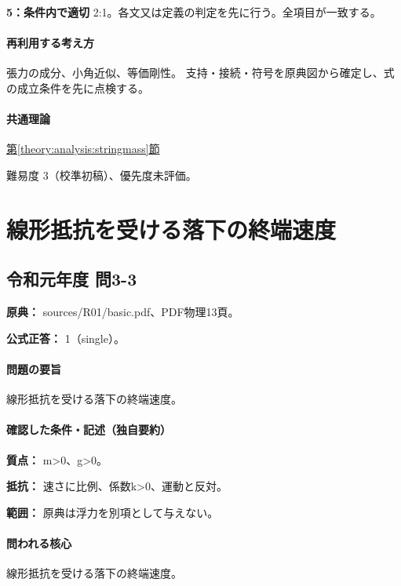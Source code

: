 \noindent\textbf{5：条件内で適切} 2:1。各文又は定義の判定を先に行う。全項目が一致する。\par

\paragraph{再利用する考え方} 張力の成分、小角近似、等価剛性。 支持・接続・符号を原典図から確定し、式の成立条件を先に点検する。

\paragraph{共通理論} \hyperref[theory:analysis:stringmass]{第\ref*{theory:analysis:stringmass}節}

\par 難易度 3（校準初稿）、優先度未評価。

\section{線形抵抗を受ける落下の終端速度}

\subsection{令和元年度 問3-3}
\label{q:r01-reg-basic-3-3}

\noindent\textbf{原典：} sources/R01/basic.pdf、PDF物理13頁。

\textbf{公式正答：} 1（single）。

\paragraph{問題の要旨} 線形抵抗を受ける落下の終端速度。

\paragraph{確認した条件・記述（独自要約）}\mbox{}\par

\noindent\textbf{質点：} m>0、g>0。\par

\noindent\textbf{抵抗：} 速さに比例、係数k>0、運動と反対。\par

\noindent\textbf{範囲：} 原典は浮力を別項として与えない。\par

\paragraph{問われる核心} 線形抵抗を受ける落下の終端速度。

